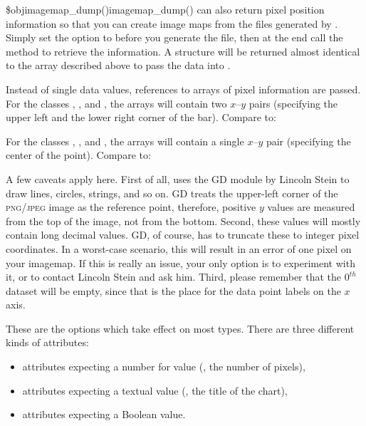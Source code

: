 \begin{MethDecl}{\$obj\deref imagemap\_dump()}{imagemap\_dump()}
\chart can also return pixel position information so that you can
create image maps from the files generated by \chart. Simply set the
 option to  before you generate the
file, then at the end call the  method to
retrieve the information. A structure will be returned almost identical
to the  array described above to pass the data into \chart.


Instead of single data values, references to arrays of pixel information
are passed. For the classes ,
,  and
, the arrays will contain two $x$--$y$ pairs
(specifying the upper left and the lower right corner of the bar).
Compare to: \\

For the classes , ,
 and , the arrays will
contain a single $x$--$y$ pair (specifying the center of the point).
Compare to:\\

A few caveats apply here. First of all, \chart uses the GD module by
Lincoln Stein to draw lines, circles, strings, and so on. GD treats the
upper-left corner of the \textsc{png}/\textsc{jpeg} image as the
reference point, therefore, positive $y$ values are measured from the
top of the image, not from the bottom. Second, these values will mostly
contain long decimal values. GD, of course, has to truncate these to
integer pixel coordinates. In a worst-case scenario, this will result in
an error of one pixel on your imagemap. If this is really an issue, your
only option is to experiment with it, or to contact Lincoln Stein and
ask him. Third, please remember that the $0^{th}$ dataset will be empty,
since that is the place for the data point labels on the $x$ axis.
\end{MethDecl}


\Attributes\label{options}%
These are the options which take effect on most \chart types.
There are three different kinds of attributes:
\begin{itemize}
\item attributes expecting a number for value (\eg, the number of pixels),
\item attributes expecting a textual value (\eg, the title of the chart),
\item attributes expecting a Boolean value.
\end{itemize}

